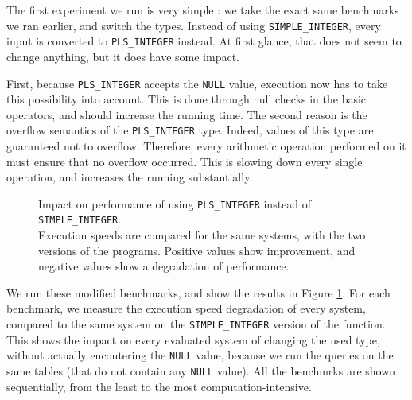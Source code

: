 \documentclass[twoside,11pt,a4paper]{article}
\newcommand{\pls}[1]{\small\texttt{#1}\normalsize}
\newcommand{\plstype}[1]{\pls{#1}}
\newcommand{\plsi}{\plstype{PLS\_INTEGER}}
\newcommand{\simpleint}{\plstype{SIMPLE\_INTEGER}}
\newcommand{\plsnull}{\pls{NULL}}
\begin{document}
The first experiment we run is very simple : we take the exact same benchmarks we ran earlier, and switch the types. Instead of using \simpleint{}, every input is converted to \plsi{} instead. At first glance, that does not seem to change anything, but it does have some impact.

First, because \plsi{} accepts the \plsnull{} value, execution now has to take this possibility into account. This is done through null checks in the basic operators, and should increase the running time. The second reason is the overflow semantics of the \plsi{} type. Indeed, values of this type are guaranteed not to overflow. Therefore, every arithmetic operation performed on it must ensure that no overflow occurred. This is slowing down every single operation, and increases the running substantially.

\begin{figure}[tp]
	\centering
	\caption[Impact on performance of using \plsi{} instead of \simpleint{}]{Impact on performance of using \plsi{} instead of \simpleint{}.\\
			\small{}Execution speeds are compared for the same systems, with the two versions of the programs. Positive values show improvement, and negative values show a degradation of performance.}
	\label{fig:exp2a}
\end{figure}

We run these modified benchmarks, and show the results in Figure \ref{fig:exp2a}. For each benchmark, we measure the execution speed degradation of every system, compared to the same system on the \simpleint{} version of the function. This shows the impact on every evaluated system of changing the used type, without actually encoutering the \plsnull{} value, because we run the queries on the same tables (that do not contain any \plsnull{} value). All the benchmrks are shown sequentially, from the least to the most computation-intensive.
\end{document}
